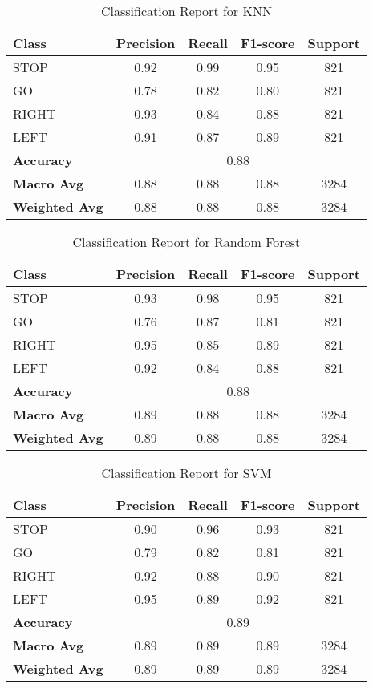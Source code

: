\begin{table}[h]
\centering
\caption{Classification Report for KNN}
\begin{tabular}{lcccc}
\hline
\textbf{Class} & \textbf{Precision} & \textbf{Recall} & \textbf{F1-score} & \textbf{Support} \\
\hline
STOP  & 0.92 & 0.99 & 0.95 & 821 \\
GO    & 0.78 & 0.82 & 0.80 & 821 \\
RIGHT & 0.93 & 0.84 & 0.88 & 821 \\
LEFT  & 0.91 & 0.87 & 0.89 & 821 \\
\hline
\textbf{Accuracy} & \multicolumn{4}{c}{0.88} \\
\textbf{Macro Avg} & 0.88 & 0.88 & 0.88 & 3284 \\
\textbf{Weighted Avg} & 0.88 & 0.88 & 0.88 & 3284 \\
\hline
\end{tabular}
\label{tab:knn_classification_report}
\end{table}


\begin{table}[h]
\centering
\caption{Classification Report for Random Forest}
\begin{tabular}{lcccc}
\hline
\textbf{Class} & \textbf{Precision} & \textbf{Recall} & \textbf{F1-score} & \textbf{Support} \\
\hline
STOP  & 0.93 & 0.98 & 0.95 & 821 \\
GO    & 0.76 & 0.87 & 0.81 & 821 \\
RIGHT & 0.95 & 0.85 & 0.89 & 821 \\
LEFT  & 0.92 & 0.84 & 0.88 & 821 \\
\hline
\textbf{Accuracy} & \multicolumn{4}{c}{0.88} \\
\textbf{Macro Avg} & 0.89 & 0.88 & 0.88 & 3284 \\
\textbf{Weighted Avg} & 0.89 & 0.88 & 0.88 & 3284 \\
\hline
\end{tabular}
\label{tab:random_forest_classification_report}
\end{table}


\begin{table}[h]
\centering
\caption{Classification Report for SVM}
\begin{tabular}{lcccc}
\hline
\textbf{Class} & \textbf{Precision} & \textbf{Recall} & \textbf{F1-score} & \textbf{Support} \\
\hline
STOP  & 0.90 & 0.96 & 0.93 & 821 \\
GO    & 0.79 & 0.82 & 0.81 & 821 \\
RIGHT & 0.92 & 0.88 & 0.90 & 821 \\
LEFT  & 0.95 & 0.89 & 0.92 & 821 \\
\hline
\textbf{Accuracy} & \multicolumn{4}{c}{0.89} \\
\textbf{Macro Avg} & 0.89 & 0.89 & 0.89 & 3284 \\
\textbf{Weighted Avg} & 0.89 & 0.89 & 0.89 & 3284 \\
\hline
\end{tabular}
\label{tab:svm_classification_report}
\end{table}